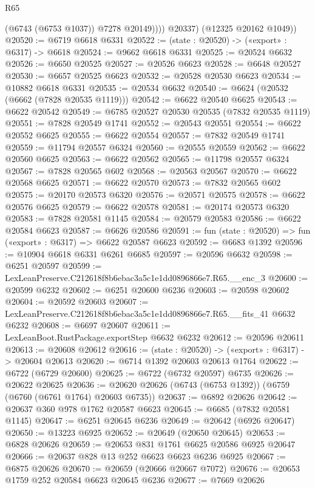 \begin{lexlean}{R65}
\begin{coremodule}
{                (@6743 (@6753 @1037))
                @7278
                @20149))))
        @20337)
      (@12325 @20162 @1049))
@20520 := @6719 @6618 @6331
@20522 := (state : @20520) -> («export» : @6317) -> @6618
@20524 := @9662 @6618 @6331
@20525 := @20524 @6632
@20526 := @6650 @20525
@20527 := @20526 @6623
@20528 := @6648 @20527
@20530 := @6657 @20525 @6623
@20532 := @20528 @20530 @6623
@20534 := @10882 @6618 @6331
@20535 := @20534 @6632
@20540 := @6624 (@20532 (@6662 (@7828 @20535 @1119)))
@20542 := @6622 @20540 @6625
@20543 := @6622 @20542
@20549 := @6785 @20527 @20530 @20535 (@7832 @20535 @1119)
@20551 := @7828 @20549 @1741
@20552 := @20543 @20551
@20554 := @6622 @20552 @6625
@20555 := @6622 @20554
@20557 := @7832 @20549 @1741
@20559 := @11794 @20557 @6324
@20560 := @20555 @20559
@20562 := @6622 @20560 @6625
@20563 := @6622 @20562
@20565 := @11798 @20557 @6324
@20567 := @7828 @20565 @602
@20568 := @20563 @20567
@20570 := @6622 @20568 @6625
@20571 := @6622 @20570
@20573 := @7832 @20565 @602
@20575 := @20170 @20573 @6320
@20576 := @20571 @20575
@20578 := @6622 @20576 @6625
@20579 := @6622 @20578
@20581 := @20174 @20573 @6320
@20583 := @7828 @20581 @1145
@20584 := @20579 @20583
@20586 := @6622 @20584 @6623
@20587 := @6626 @20586
@20591 := fun (state : @20520) => fun («export» : @6317) => @6622 @20587 @6623
@20592 := @6683 @1392
@20596 := @10904 @6618 @6331 @6261 @6685
@20597 := @20596 @6632
@20598 := @6251 @20597
@20599 := LexLeanPreserve.C212618f8b6ebac3a5c1e1dd0896866e7.R65.__enc_3
@20600 := @20599 @6232
@20602 := @6251 @20600 @6236
@20603 := @20598 @20602
@20604 := @20592 @20603
@20607 := LexLeanPreserve.C212618f8b6ebac3a5c1e1dd0896866e7.R65.__fits_41 @6632 @6232
@20608 := @6697 @20607
@20611 := LexLeanBoot.RustPackage.exportStep @6632 @6232
@20612 := @20596 @20611
@20613 := @20608 @20612
@20616 := (state : @20520) -> («export» : @6317) -> @20604 @20613
@20620 := @6714 @1392 @20603 @20613 @1764
@20622 := @6722 (@6729 @20600)
@20625 := @6722 (@6732 @20597) @6735
@20626 := @20622 @20625
@20636 := @20620 @20626 (@6743 (@6753 @1392)) (@6759 (@6760 (@6761 @1764) @20603 @6735))
@20637 := @6892 @20626
@20642 := @20637 @360 @978 @1762 @20587 @6623
@20645 := @6685 (@7832 @20581 @1145)
@20647 := @6251 @20645 @6236
@20649 := @20642 (@6926 @20647)
@20650 := @13223 @6925
@20652 := @20649 (@20650 @20645)
@20653 := @6828 @20626
@20659 := @20653 @831 @1761 @6625 @20586 @6925 @20647
@20666 := @20637 @828 @13 @252 @6623 @6623 @6236 @6925
@20667 := @6875 @20626
@20670 := @20659 (@20666 @20667 @7072)
@20676 := @20653 @1759 @252 @20584 @6623 @20645 @6236
@20677 := @7669 @20626
}
\end{coremodule}
\end{lexlean}
